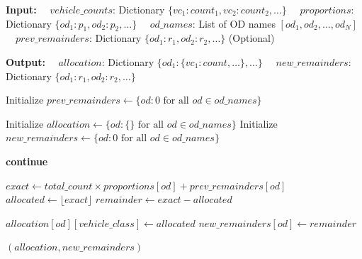 \begin{algorithm}
\caption{Perfect Vehicle Allocation with Remainder Tracking}
\label{alg:perfect_allocation}
\begin{algorithmic}[1]
\State \textbf{Input:}
\State $\quad vehicle\_counts$: Dictionary $\{vc_1: count_1, vc_2: count_2, \dots\}$
\State $\quad proportions$: Dictionary $\{od_1: p_1, od_2: p_2, \dots\}$
\State $\quad od\_names$: List of OD names $[od_1, od_2, \dots, od_N]$
\State $\quad prev\_remainders$: Dictionary $\{od_1: r_1, od_2: r_2, \dots\}$ (Optional)

\State \textbf{Output:}
\State $\quad allocation$: Dictionary $\{od_1: \{vc_1: count, \dots\}, \dots\}$
\State $\quad new\_remainders$: Dictionary $\{od_1: r_1, od_2: r_2, \dots\}$

        \State Initialize $prev\_remainders \gets \{od: 0 \text{ for all } od \in od\_names\}$
    \EndIf
    
    \State Initialize $allocation \gets \{od: \{\} \text{ for all } od \in od\_names\}$
    \State Initialize $new\_remainders \gets \{od: 0 \text{ for all } od \in od\_names\}$
    
            \State \textbf{continue}
        \EndIf
        
            \State $exact \gets total\_count \times proportions[od] + prev\_remainders[od]$
            \State $allocated \gets \lfloor exact \rfloor$
            \State $remainder \gets exact - allocated$
            
            \State $allocation[od][vehicle\_class] \gets allocated$
            \State $new\_remainders[od] \gets remainder$
        \EndFor
    \EndFor
    
    \State \Return $(allocation, new\_remainders)$
\EndProcedure
\end{algorithmic}
\end{algorithm}

